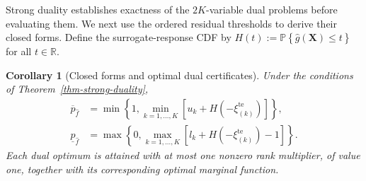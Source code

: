 \documentclass[review,11pt,3p,authoryear,nopreprintline]{elsarticle}
\newtheorem{corollary}{Corollary}
\begin{document}
Strong duality establishes exactness of the $2K$-variable dual problems before evaluating them. We next use the ordered residual thresholds to derive their closed forms. Define the surrogate-response CDF by $H(t):=\mathbb P\left\{\hat g(\bm X)\le t\right\}$ for all $t\in\mathbb R$.

\begin{corollary}[Closed forms and optimal dual certificates]
  \label{thm-closed-form-bounds}
  Under the conditions of Theorem~\ref{thm-strong-duality},
  \begin{align}
    \overline p_{\hat f}
    &=\min\left\{1,\min_{k=1,\ldots,K}\left[u_k+H\left(-\xi_{(k)}^{\mathrm{te}}\right)\right]\right\},
    \label{eq-dw-closed-upper}\\
    \underline p_{\hat f}
    &=\max\left\{0,\max_{k=1,\ldots,K}\left[l_k+H\left(-\xi_{(k)}^{\mathrm{te}}\right)-1\right]\right\}.
    \label{eq-dw-closed-lower}
  \end{align}
  Each dual optimum is attained with at most one nonzero rank multiplier, of value one, together with its corresponding optimal marginal function.
\end{corollary}
\end{document}
